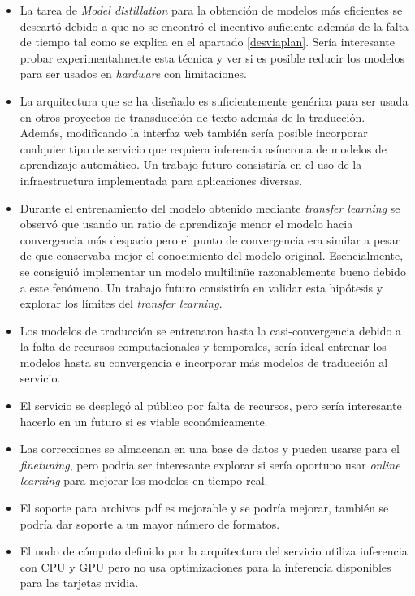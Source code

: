 \begin{itemize}
    \item La tarea de \textit{Model distillation} para la obtención de modelos más eficientes se descartó debido a que no se encontró el incentivo suficiente además de la falta de tiempo tal como se explica en el apartado \ref{desviaplan}. Sería interesante probar experimentalmente esta técnica y ver si es posible reducir los modelos para ser usados en \textit{hardware} con limitaciones.
    \item La arquitectura que se ha diseñado es suficientemente genérica para ser usada en otros proyectos de transducción de texto además de la traducción. Además, modificando la interfaz web también sería posible incorporar cualquier tipo de servicio que requiera inferencia asíncrona de modelos de aprendizaje automático. Un trabajo futuro consistiría en el uso de la infraestructura implementada para aplicaciones diversas.
    \item Durante el entrenamiento del modelo obtenido mediante \textit{transfer learning} se observó que usando un ratio de aprendizaje menor el modelo hacia convergencia más despacio pero el punto de convergencia era similar a pesar de que conservaba mejor el conocimiento del modelo original. Esencialmente, se consiguió implementar un modelo multilin{\"u}e razonablemente bueno debido a este fenómeno. Un trabajo futuro consistiría en validar esta hipótesis y explorar los límites del \textit{transfer learning}.
    \item Los modelos de traducción se entrenaron hasta la casi-convergencia debido a la falta de recursos computacionales y temporales, sería ideal entrenar los modelos hasta su convergencia e incorporar más modelos de traducción al servicio.
    \item El servicio se desplegó al público por falta de recursos, pero sería interesante hacerlo en un futuro si es viable económicamente.
    \item Las correcciones se almacenan en una base de datos y pueden usarse para el \textit{finetuning}, pero podría ser interesante explorar si sería oportuno usar \textit{online learning} para mejorar los modelos en tiempo real.
    \item El soporte para archivos pdf es mejorable y se podría mejorar, también se podría dar soporte a un mayor número de formatos.
    \item El nodo de cómputo definido por la arquitectura del servicio utiliza inferencia con CPU y GPU pero no usa optimizaciones para la inferencia disponibles para las tarjetas nvidia.
\end{itemize}